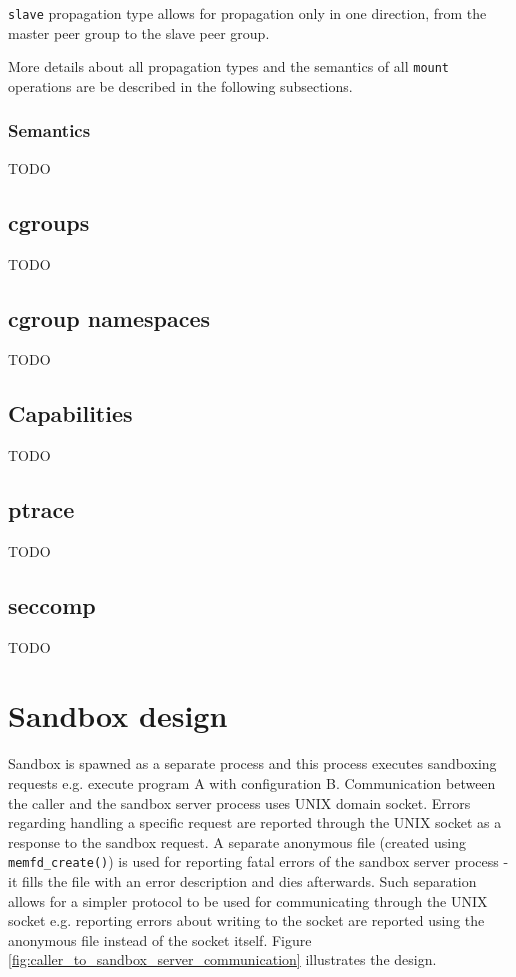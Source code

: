 \documentclass[licencjacka,en]{pracamgr}
\begin{document}
\texttt{slave} propagation type allows for propagation only in one direction, from the master peer group to the slave peer group.

More details about all propagation types and the semantics of all \texttt{mount} operations are be described in the following subsections.

\subsection{Semantics}
TODO

\section{cgroups}
TODO

\section{cgroup namespaces}
TODO

\section{Capabilities}
TODO

\section{ptrace}
TODO

\section{seccomp}
TODO

\chapter{Sandbox design}

Sandbox is spawned as a separate process and this process executes sandboxing requests e.g. execute program A with configuration B. Communication between the caller and the sandbox server process uses UNIX domain socket. Errors regarding handling a specific request are reported through the UNIX socket as a response to the sandbox request. A separate anonymous file (created using \texttt{memfd\_create()}) is used for reporting fatal errors of the sandbox server process - it fills the file with an error description and dies afterwards. Such separation allows for a simpler protocol to be used for communicating through the UNIX socket e.g. reporting errors about writing to the socket are reported using the anonymous file instead of the socket itself. Figure \ref{fig:caller_to_sandbox_server_communication} illustrates the design.
\end{document}
